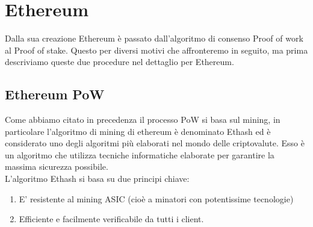 \documentclass[a4paper,11pt]{report}
\begin{document}
\section{Ethereum}
Dalla sua creazione Ethereum è passato dall'algoritmo di consenso Proof of work al Proof of stake. Questo per diversi motivi che affronteremo in seguito, ma prima descriviamo queste due procedure nel dettaglio per Ethereum.

\subsection{Ethereum PoW}
Come abbiamo citato in precedenza il processo PoW si basa sul mining, in particolare l'algoritmo di mining di ethereum è denominato Ethash ed è considerato uno degli algoritmi più elaborati nel mondo delle criptovalute. Esso è un algoritmo che utilizza tecniche informatiche elaborate per garantire la massima sicurezza possibile.\\
L'algoritmo Ethash si basa su due principi chiave:
\begin{enumerate}
\item E' resistente al mining ASIC (cioè a minatori con potentissime tecnologie)
\item Efficiente e facilmente verificabile da tutti i client.
\end{enumerate}
\end{document}
